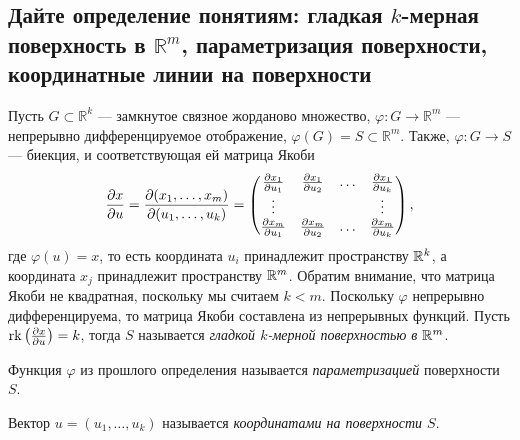 
\subsection{Дайте определение понятиям: гладкая $k$-мерная поверхность в $\mathbb{R}^{m}$, параметризация поверхности, координатные линии на поверхности}

\begin{definition}
    Пусть $G \subset \mathbb{R}^{k}$ --- замкнутое связное жорданово множество, $\varphi \colon G \to \mathbb{R}^{m}$ --- непрерывно дифференцируемое отображение, $\varphi(G) = S \subset \mathbb{R}^{m}$.
    Также, $\varphi \colon G \to S$ --- биекция, и соответствующая ей матрица Якоби
    \[
        \pdv{x}{u} = \pdv{(x_{1}, \ldots, x_{m})}{(u_{1}, \ldots, u_{k})} = \begin{pmatrix}
            \pdv{x_{1}}{u_{1}} & \pdv{x_{1}}{u_{2}} & \ldots & \pdv{x_{1}}{u_{k}} \\
            \vdots & & & \vdots \\
            \pdv{x_{m}}{u_{1}} & \pdv{x_{m}}{u_{2}} & \ldots & \pdv{x_{m}}{u_{k}}
        \end{pmatrix},
    \]
    где $\varphi(u) = x$, то есть координата $u_{i}$ принадлежит пространству $\mathbb{R}^{k}$, а координата $x_{j}$ принадлежит пространству $\mathbb{R}^{m}$.
    Обратим внимание, что матрица Якоби не квадратная, поскольку мы считаем $k < m$.
    Поскольку $\varphi$ непрерывно дифференцируема, то матрица Якоби составлена из непрерывных функций.
    Пусть $\rk\pqty{\pdv{x}{u}} = k$, тогда $S$ называется {\it гладкой $k$-мерной поверхностью в $\mathbb{R}^{m}$}.
\end{definition}

\begin{definition}
    Функция $\varphi$ из прошлого определения называется {\it параметризацией} поверхности $S$.
\end{definition}

\begin{definition}
    Вектор $u = (u_{1}, \ldots, u_{k})$ называется {\it координатами на поверхности $S$}.
\end{definition}




